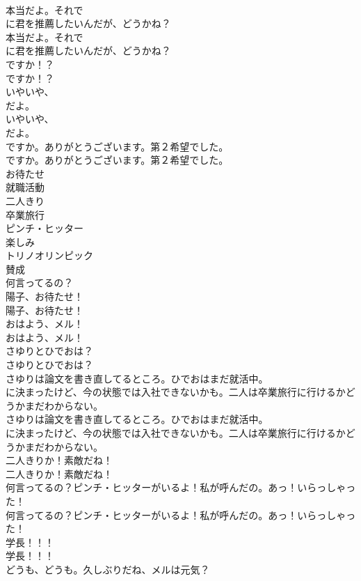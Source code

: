 \documentclass[8pt]{extreport}
\begin{document}
\begin{CJK}{UTF8}{min}
\\	本当だよ。それで
\\	に君を推薦したいんだが、どうかね？	
\\	本当だよ。それで
\\	に君を推薦したいんだが、どうかね？ 
\\	ですか！？	
\\	ですか！？ 
\\	いやいや、
\\	だよ。	
\\	いやいや、
\\	だよ。 
\\	ですか。ありがとうございます。第２希望でした。	
\\	ですか。ありがとうございます。第２希望でした。 
\\	お待たせ
\\	就職活動
\\	二人きり
\\	卒業旅行
\\	ピンチ・ヒッター
\\	楽しみ
\\	トリノオリンピック
\\	賛成
\\	何言ってるの？
\\	陽子、お待たせ！	
\\	陽子、お待たせ！ 
\\	おはよう、メル！	
\\	おはよう、メル！ 
\\	さゆりとひでおは？	
\\	さゆりとひでおは？ 
\\	さゆりは論文を書き直してるところ。ひでおはまだ就活中。
\\	に決まったけど、今の状態では入社できないかも。二人は卒業旅行に行けるかどうかまだわからない。	
\\	さゆりは論文を書き直してるところ。ひでおはまだ就活中。
\\	に決まったけど、今の状態では入社できないかも。二人は卒業旅行に行けるかどうかまだわからない。 
\\	二人きりか！素敵だね！	
\\	二人きりか！素敵だね！ 
\\	何言ってるの？ピンチ・ヒッターがいるよ！私が呼んだの。あっ！いらっしゃった！	
\\	何言ってるの？ピンチ・ヒッターがいるよ！私が呼んだの。あっ！いらっしゃった！ 
\\	学長！！！	
\\	学長！！！ 
\\	どうも、どうも。久しぶりだね、メルは元気？	

\end{CJK}
\end{document}
